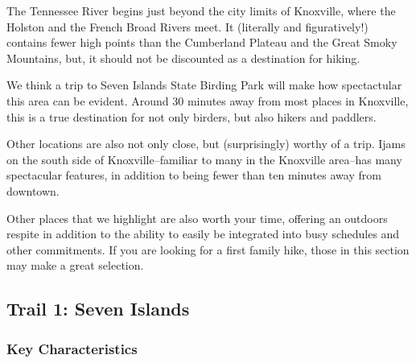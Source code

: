 \documentclass[
  letterpaper,
  DIV=11,
  numbers=noendperiod]{scrartcl}
\begin{document}
The Tennessee River begins just beyond the city limits of Knoxville,
where the Holston and the French Broad Rivers meet. It (literally and
figuratively!) contains fewer high points than the Cumberland Plateau
and the Great Smoky Mountains, but, it should not be discounted as a
destination for hiking.

We think a trip to Seven Islands State Birding Park will make how
spectactular this area can be evident. Around 30 minutes away from most
places in Knoxville, this is a true destination for not only birders,
but also hikers and paddlers.

Other locations are also not only close, but (surprisingly) worthy of a
trip. Ijams on the south side of Knoxville--familiar to many in the
Knoxville area--has many spectacular features, in addition to being
fewer than ten minutes away from downtown.

Other places that we highlight are also worth your time, offering an
outdoors respite in addition to the ability to easily be integrated into
busy schedules and other commitments. If you are looking for a first
family hike, those in this section may make a great selection.

\hypertarget{trail-1-seven-islands}{%
\subsection{Trail 1: Seven Islands}\label{trail-1-seven-islands}}

\hypertarget{key-characteristics}{%
\subsubsection{Key Characteristics}\label{key-characteristics}}
\end{document}
